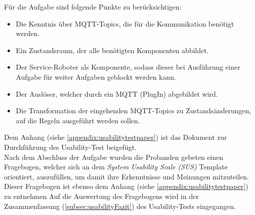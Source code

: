         Für die Aufgabe sind folgende Punkte zu berücksichtigen:
        \begin{itemize}
            \item Die Kenntnis über \acs{MQTT}-Topics, die für die Kommunikation benötigt werden.
            \item Ein Zustandsraum, der alle benötigten Komponenten abbildet.
            \item Der Service-Roboter als Komponente, sodass dieser bei Ausführung einer Aufgabe für weiter Aufgaben geblockt werden kann. 
            \item Der Auslöser, welcher durch ein \acs{MQTT} (PlugIn) abgebildet wird.
            \item Die Transformation der eingehenden \acs{MQTT}-Topics zu Zustandsänderungen, auf die Regeln ausgeführt werden sollen.
        \end{itemize}
        Dem Anhang (siehe \ref{appendix:usabilitytestpaper}) ist das Dokument zur Durchführung des Usability-Test beigefügt. 
        \\
        \linebreak
        Nach dem Abschluss der Aufgabe wurden die Probanden gebeten einen Fragebogen, welcher sich an dem \textit{System Usability Scale (SUS)} 
        Template orientiert, auszufüllen, um damit ihre Erkenntnisse und Meinungen mitzuteilen. Dieser Fragebogen ist ebenso dem Anhang (siehe \ref{appendix:usabilitytestpaper}) zu entnehmen Auf die Auswertung des Fragebogens wird in der 
        Zusammenfassung (\ref{subsec:usabilityFazit}) des Usability-Tests eingegangen. 

